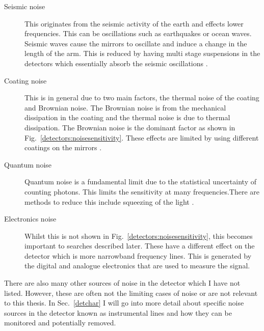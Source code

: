\begin{description}
\item[Seismic noise] This originates from the seismic activity of the earth and effects lower frequencies. This can be oscillations such as earthquakes or ocean waves. Seismic waves cause the mirrors to oscillate and induce a change in the length of the arm. This is reduced by having multi stage suspensions in the detectors which essentially absorb the seismic oscillations \citep{matichard2015SeismicIsolation}.

\item[Coating noise] This is in general due to two main factors, the thermal noise of the coating and Brownian noise. The Brownian noise is from the mechanical dissipation in the coating and the thermal noise is due to thermal dissipation. The Brownian noise is the dominant factor as shown in Fig.~\ref{detectors:noisesensitivity}. These effects are limited by using different coatings on the mirrors \citep{abernathy0OverviewResearch}.

\item[Quantum noise] Quantum noise is a fundamental limit due to the statistical uncertainty of counting photons. This limits the sensitivity at many frequencies.There are methods to reduce this include squeezing of the light \citep{aasi2013EnhancedSensitivity}. 

\item[Electronics noise] Whilst this is not shown in Fig.~\ref{detectors:noisesensitivity}, this becomes important to searches described later. These have a different effect on the detector which is more narrowband frequency lines. This is generated by the digital and analogue electronics that are used to measure the signal. 
\end{description}

There are also many other sources of noise in the detector which I have not listed. However, these are often not the limiting cases of noise or are not relevant to this thesis.
In Sec.~\ref{detchar} I will go into more detail about specific noise sources in the detector known as instrumental lines and how they can be monitored and potentially removed. 












